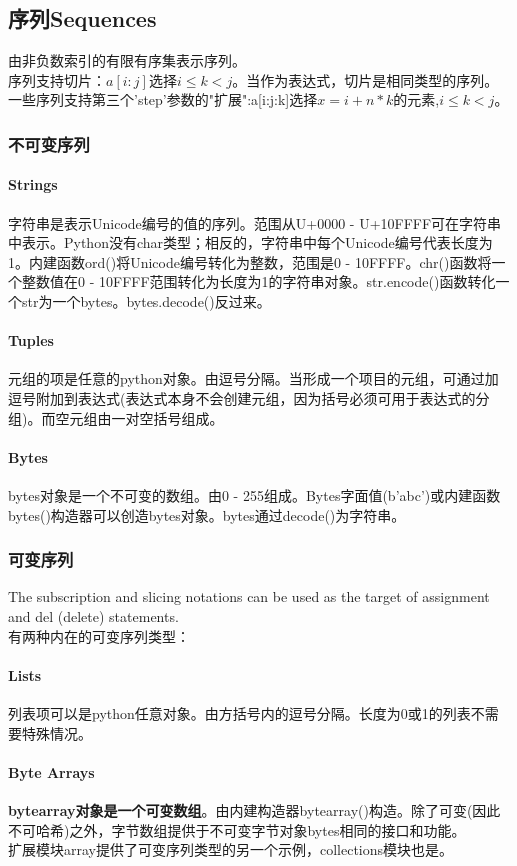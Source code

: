 \documentclass[10pt,UTF8]{ctexart}
\begin{document}
\begin{flushleft}
\subsection{序列Sequences}
由非负数索引的有限有序集表示序列。\\
\indent 序列支持切片：$a[i:j]$选择$i\le k<j$。当作为表达式，切片是相同类型的序列。\\
\indent 一些序列支持第三个'step'参数的"扩展":a[i:j:k]选择$x = i + n*k$的元素,$i\le k<j$。
\subsubsection{不可变序列}
\paragraph{Strings}字符串是表示Unicode编号的值的序列。范围从U+0000 - U+10FFFF可在字符串中表示。Python没有char类型；相反的，字符串中每个Unicode编号代表长度为1。内建函数ord()将Unicode编号转化为整数，范围是0 - 10FFFF。chr()函数将一个整数值在0 - 10FFFF范围转化为长度为1的字符串对象。str.encode()函数转化一个str为一个bytes。bytes.decode()反过来。
\paragraph{Tuples}元组的项是任意的python对象。由逗号分隔。当形成一个项目的元组，可通过加逗号附加到表达式(表达式本身不会创建元组，因为括号必须可用于表达式的分组)。而空元组由一对空括号组成。
\paragraph{Bytes}bytes对象是一个不可变的数组。由0 - 255组成。Bytes字面值(b'abc')或内建函数bytes()构造器可以创造bytes对象。bytes通过decode()为字符串。
\subsubsection{可变序列}
The subscription and slicing notations can be used as the target of assignment and del (delete) statements.\\
\indent 有两种内在的可变序列类型：
\paragraph{Lists}列表项可以是python任意对象。由方括号内的逗号分隔。长度为0或1的列表不需要特殊情况。
\paragraph{Byte Arrays}\textbf{bytearray对象是一个可变数组}。由内建构造器bytearray()构造。除了可变(因此不可哈希)之外，字节数组提供于不可变字节对象bytes相同的接口和功能。\\
\indent 扩展模块array提供了可变序列类型的另一个示例，collections模块也是。

\end{flushleft}
\end{document}
